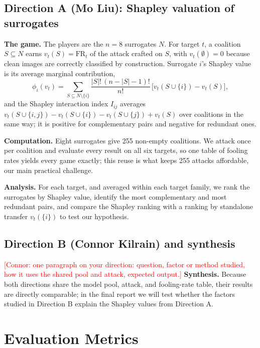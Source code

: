 \documentclass{article}
\newcommand{\connor}[1]{\textcolor{red}{[Connor: #1]}}
\begin{document}
\subsection{Direction A (Mo Liu): Shapley valuation of surrogates}

\textbf{The game.} The players are the $n=8$ surrogates $N$. For target $t$, a coalition $S\subseteq N$ earns $v_t(S)=\mathrm{FR}_t$ of the attack crafted on $S$, with $v_t(\emptyset)=0$ because clean images are correctly classified by construction. Surrogate $i$'s Shapley value is its average marginal contribution,
\begin{equation*}
  \phi_i(v_t) = \sum_{S\subseteq N\setminus\{i\}} \frac{|S|!\,(n-|S|-1)!}{n!}\,\big[v_t(S\cup\{i\}) - v_t(S)\big],
\end{equation*}
and the Shapley interaction index $I_{ij}$ \citep{grabisch1999axiomatic} averages $v_t(S\cup\{i,j\})-v_t(S\cup\{i\})-v_t(S\cup\{j\})+v_t(S)$ over coalitions in the same way; it is positive for complementary pairs and negative for redundant ones.

\textbf{Computation.} Eight surrogates give 255 non-empty coalitions. We attack once per coalition and evaluate every result on all six targets, so one table of fooling rates yields every game exactly; this reuse is what keeps 255 attacks affordable, our main practical challenge.

\textbf{Analysis.} For each target, and averaged within each target family, we rank the surrogates by Shapley value, identify the most complementary and most redundant pairs, and compare the Shapley ranking with a ranking by standalone transfer $v_t(\{i\})$ to test our hypothesis.

\subsection{Direction B (Connor Kilrain) and synthesis}

\connor{one paragraph on your direction: question, factor or method studied, how it uses the shared pool and attack, expected output.} \textbf{Synthesis.} Because both directions share the model pool, attack, and fooling-rate table, their results are directly comparable; in the final report we will test whether the factors studied in Direction B explain the Shapley values from Direction A.

\section{Evaluation Metrics}
\end{document}
